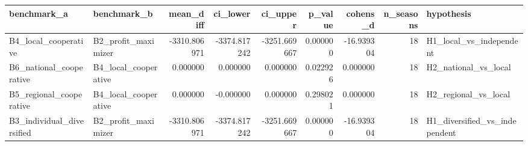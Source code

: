 \begin{tabular}{llrrrrrrl}
\toprule
benchmark\_a & benchmark\_b & mean\_diff & ci\_lower & ci\_upper & p\_value & cohens\_d & n\_seasons & hypothesis \\
\midrule
B4\_local\_cooperative & B2\_profit\_maximizer & -3310.806971 & -3374.817242 & -3251.669667 & 0.000000 & -16.939304 & 18 & H1\_local\_vs\_independent \\
B6\_national\_cooperative & B4\_local\_cooperative & 0.000000 & 0.000000 & 0.000000 & 0.022926 & 0.000000 & 18 & H2\_national\_vs\_local \\
B5\_regional\_cooperative & B4\_local\_cooperative & 0.000000 & -0.000000 & 0.000000 & 0.298021 & 0.000000 & 18 & H2\_regional\_vs\_local \\
B3\_individual\_diversified & B2\_profit\_maximizer & -3310.806971 & -3374.817242 & -3251.669667 & 0.000000 & -16.939304 & 18 & H1\_diversified\_vs\_independent \\
\bottomrule
\end{tabular}
